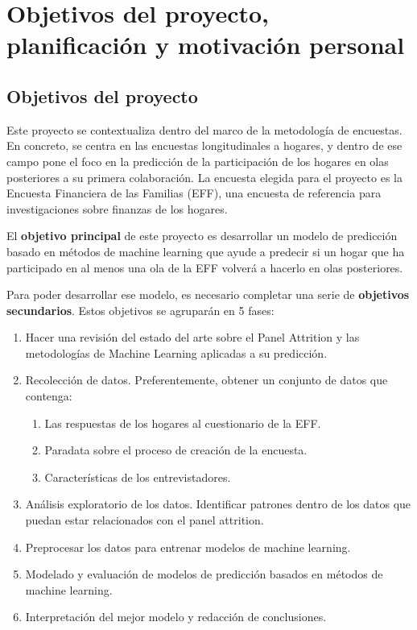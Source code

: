 \chapter{Objetivos del proyecto, planificación y motivación personal}
\label{chapter:objetivos}
\section{Objetivos del proyecto}

Este proyecto se contextualiza dentro del marco de la metodología de encuestas. En concreto, se centra en las encuestas longitudinales a hogares, y dentro de ese campo pone el foco en la predicción de la participación de los hogares en olas posteriores a su primera colaboración. La encuesta elegida para el proyecto es la Encuesta Financiera de las Familias (EFF), una encuesta de referencia para investigaciones sobre finanzas de los hogares.

El \textbf{objetivo principal} de este proyecto es desarrollar un modelo de predicción basado en métodos de machine learning que ayude a predecir si un hogar que ha participado en al menos una ola de la EFF volverá a hacerlo en olas posteriores.

Para poder desarrollar ese modelo, es necesario completar una serie de \textbf{objetivos secundarios}. Estos objetivos se agruparán en 5 fases:

\begin{enumerate}
    \item Hacer una revisión del estado del arte sobre el Panel Attrition y las metodologías de Machine Learning aplicadas a su predicción.
    \item Recolección de datos. Preferentemente, obtener un conjunto de datos que contenga:
    \begin{enumerate}
        \item Las respuestas de los hogares al cuestionario de la EFF.
        \item Paradata sobre el proceso de creación de la encuesta.
        \item Características de los entrevistadores.
    \end{enumerate}
    \item Análisis exploratorio de los datos. Identificar patrones dentro de los datos que puedan estar relacionados con el panel attrition.
    \item Preprocesar los datos para entrenar modelos de machine learning.
    \item Modelado y evaluación de modelos de predicción basados en métodos de machine learning.
    \item Interpretación del mejor modelo y redacción de conclusiones.
\end{enumerate}

